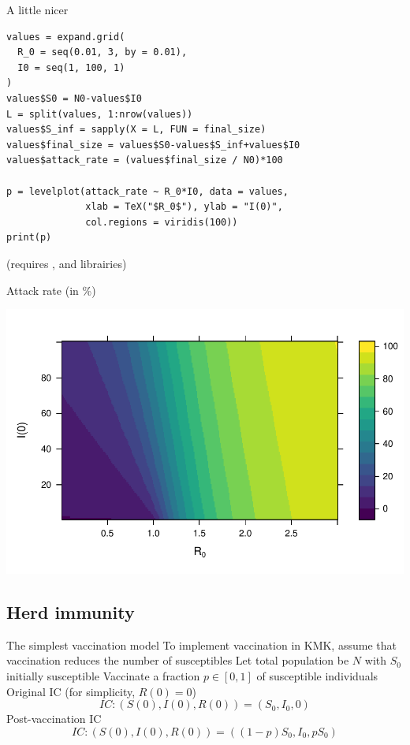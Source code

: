 \documentclass[aspectratio=169]{beamer}\usepackage[]{graphicx}\usepackage[]{xcolor}
\begin{document}
\begin{frame}[fragile]{A little nicer}
\begin{lstlisting}
values = expand.grid(
  R_0 = seq(0.01, 3, by = 0.01),
  I0 = seq(1, 100, 1)
)
values$S0 = N0-values$I0
L = split(values, 1:nrow(values))
values$S_inf = sapply(X = L, FUN = final_size)
values$final_size = values$S0-values$S_inf+values$I0
values$attack_rate = (values$final_size / N0)*100

p = levelplot(attack_rate ~ R_0*I0, data = values, 
              xlab = TeX("$R_0$"), ylab = "I(0)",
              col.regions = viridis(100))
print(p)
\end{lstlisting}
(requires ,  and  librairies)
\end{frame}


\begin{frame}{Attack rate (in \%)}
  \begin{center}
    \includegraphics[width=\textwidth]{FIGS/course-01-KMK_attack_rate-1.pdf}
  \end{center}
\end{frame}


\subsection{Herd immunity}


\begin{frame}{The simplest vaccination model}
To implement vaccination in KMK, assume that vaccination reduces the number of susceptibles
\vfill
Let total population be $N$ with $S_0$ initially susceptible
\vfill
Vaccinate a fraction $p\in[0,1]$ of susceptible individuals
\vfill
Original IC (for simplicity, $R(0)=0$)
\begin{equation}\label{eq:IC_KMK_novacc}
IC: (S(0),I(0),R(0)) = (S_0,I_0,0)
\end{equation}
Post-vaccination IC 
\begin{equation}\label{eq:IC_KMK_vacc}
IC: (S(0),I(0),R(0)) = ((1-p)S_0,I_0,pS_0)
\end{equation}
\end{frame}
\end{document}
